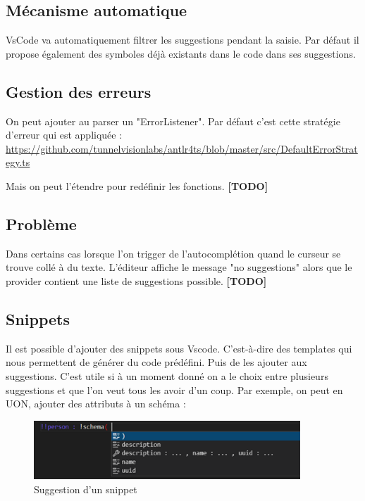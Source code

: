 \documentclass[
    iict, %
    il, %
]{heig-tb}
\begin{document}
\subsection{Mécanisme automatique}
VsCode va automatiquement filtrer les suggestions pendant la saisie.
Par défaut il propose également des symboles déjà existants dans le code dans ses suggestions.

\subsection{Gestion des erreurs}
On peut ajouter au parser un "ErrorListener".
Par défaut c'est cette stratégie d'erreur qui est appliquée :
\href{https://github.com/tunnelvisionlabs/antlr4ts/blob/master/src/DefaultErrorStrategy.ts}{https://github.com/tunnelvisionlabs/antlr4ts/blob/master/src/DefaultErrorStrategy.ts}

Mais on peut l'étendre pour redéfinir les fonctions.
\textbf{[TODO]}

\subsection{Problème}
Dans certains cas lorsque l'on trigger de l'autocomplétion quand le curseur se trouve collé à du texte. L'éditeur affiche le message "no suggestions" alors que le provider contient une liste de suggestions possible.
\textbf{[TODO]}

\subsection{Snippets}
Il est possible d'ajouter des snippets sous Vscode. C'est-à-dire des templates qui nous permettent de générer du code prédéfini. Puis de les ajouter aux suggestions.
C'est utile si à un moment donné on a le choix entre plusieurs suggestions et que l'on veut tous les avoir d'un coup.
Par exemple, on peut en UON, ajouter des attributs à un schéma :

\begin{figure}[!ht]
    \begin{center}
        \includegraphics[width=10cm]{assets/figures/snippet-suggestion.png}
    \end{center}
    \caption[Suggestion d'un snippet]{\label{snippet-suggestion} Suggestion d'un snippet}
\end{figure}
\end{document}
